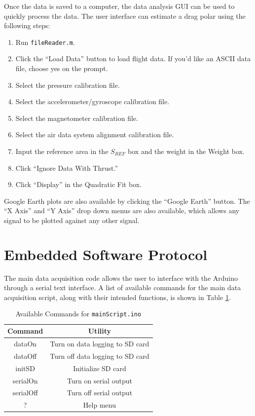 Once the data is saved to a computer, the data analysis GUI can be used to quickly process the data.  The user interface can estimate a drag polar using the following steps:
\begin{enumerate}
\item Run \texttt{fileReader.m}.
\item Click the ``Load Data'' button to load flight data. If you'd like an ASCII data file, choose yes on the prompt.
\item Select the pressure calibration file.
\item Select the accelerometer/gyroscope calibration file.
\item Select the magnetometer calibration file.
\item Select the air data system alignment calibration file.
\item Input the reference area in the $S_{REF}$ box and the weight in the Weight box.
\item Click ``Ignore Data With Thrust.''
\item Click ``Display'' in the Quadratic Fit box.
\end{enumerate}

Google Earth plots are also available by clicking the ``Google Earth'' button. The ``X Axis'' and ``Y Axis'' drop down menus are also available, which allows any signal to be plotted against any other signal.

\section{Embedded Software Protocol}
The main data acquisition code allows the user to interface with the Arduino through a serial text interface. A list of available commands for the main data acquisition script, along with their intended functions, is shown in Table \ref{table:mainScriptComms}.
\begin{table}[H]
\caption{Available Commands for \texttt{mainScript.ino}}
\centering
\begin{tabular}{|c | c|}
\hline
 Command & Utility\\
 \hline\hline
dataOn & Turn on data logging to SD card\\\hline
dataOff & Turn off data logging to SD card\\\hline
initSD & Initialize SD card\\\hline
serialOn & Turn on serial output\\\hline
serialOff & Turn off serial output\\\hline
? & Help menu\\\hline
\end{tabular}
\label{table:mainScriptComms}
\end{table}

